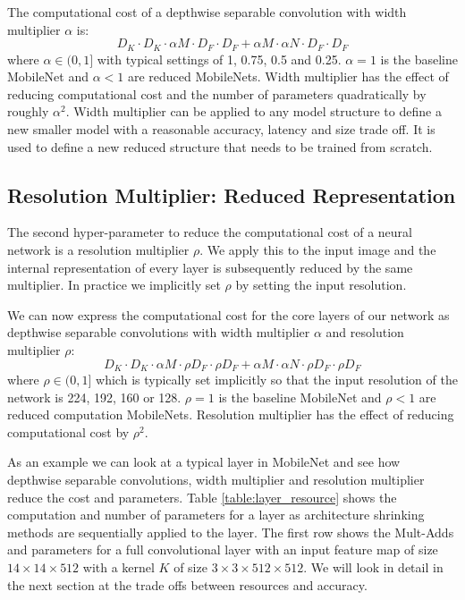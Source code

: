 \documentclass[10pt,twocolumn,letterpaper]{article}
\begin{document}
The computational cost of a depthwise separable convolution with width multiplier $\alpha$ is:  
\begin{equation}
D_K \cdot D_K \cdot \alpha M \cdot D_F \cdot D_F +  \alpha M \cdot \alpha N \cdot D_F \cdot D_F
\end{equation}
where $\alpha \in (0,1]$ with typical settings of 1, 0.75, 0.5 and 0.25. $\alpha=1$ is the baseline MobileNet and $\alpha<1$
are reduced MobileNets. Width multiplier has the effect of reducing computational cost and the number of parameters quadratically by roughly $\alpha^2$. Width multiplier can be applied to any model structure to define a new smaller model with a reasonable accuracy, latency and size trade off. It is used to define a new reduced structure that needs to be trained from scratch.

\subsection{Resolution Multiplier: Reduced Representation}

The second hyper-parameter to reduce the computational cost of a neural network is a resolution multiplier $\rho$. We apply this to the input image and the internal representation of every layer is subsequently reduced by the same multiplier. In practice we implicitly set $\rho$ by setting the input resolution. 

We can now express the computational cost for the core layers of our network as depthwise separable convolutions with width multiplier $\alpha$ and resolution multiplier $\rho$:
\begin{equation}
D_K \cdot D_K \cdot \alpha M \cdot \rho D_F \cdot \rho D_F +  \alpha M \cdot \alpha N \cdot \rho D_F \cdot \rho D_F
\end{equation}
where $\rho \in (0,1]$ which is typically set implicitly so that the input resolution of the network is 224, 192, 160 or 128. $\rho=1$ is the baseline MobileNet and $\rho<1$
are reduced computation MobileNets. Resolution multiplier has the effect of reducing computational cost by $\rho^2$.

As an example we can look at a typical layer in MobileNet and see how depthwise separable convolutions, width multiplier and resolution multiplier reduce the cost and parameters. Table \ref{table:layer_resource} shows the computation and number of parameters for a layer as architecture shrinking methods are sequentially applied to the layer. The first row shows the Mult-Adds and parameters for a full convolutional layer with an input feature map of size $14 \times 14 \times 512$ with a kernel $K$ of size $3 \times 3 \times 512 \times 512$. We will look in detail in the next section at the trade offs between resources and accuracy.
\end{document}
